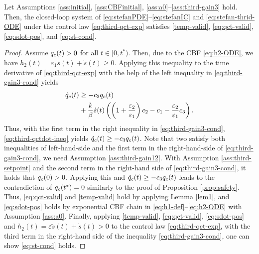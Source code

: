 \documentclass[10pt,a4paper]{amsart}
\newcommand{\ep}{\varepsilon}
\begin{document}
\begin{proposition}
    Let Assumptions \ref{ass:initial}, \ref{ass:CBFinitial}, \ref{ass:a0}--\ref{ass:third-gain3} hold. Then, the closed-loop system of \eqref{eq:stefanPDE}--\eqref{eq:stefanIC} and \eqref{eq:stefan-thrid-ODE} under the control law \eqref{eq:third-qct-exp} satisfies \eqref{temp-valid}, \eqref{eq:qct-valid}, \eqref{eq:sdot-pos}, and \eqref{eq:st-cond}. 
\end{proposition}

\begin{proof}
Assume $q_{\rm c}(t) > 0 $ for all $t \in [0, t^*)$. Then, due to the CBF \eqref{eq:h2-ODE}, we have $h_2(t) = \ep_1 \ddot s(t) + \dot s(t) \geq 0$. Applying this inequality to the time derivative of \eqref{eq:third-qct-exp}  with the help of the left inequality in \eqref{eq:third-gain3-cond} yields
\begin{align}
    \dot q_{\rm c}(t) &\geq - c_3 q_{\rm c}(t) \notag\\
    &+ \frac{k}{\beta} \dot s(t) \left( \left(1 + \frac{\ep_2}{\ep_1} \right) c_2 - c_1  - \frac{ \ep_2}{\ep_1} c_3  \right) . \label{eq:third-qctdot-ineq}
\end{align}
Thus, with the first term in the right inequality in \eqref{eq:third-gain3-cond}, 
\eqref{eq:third-qctdot-ineq} yields $\dot q_{\rm c}(t) \geq - c_3 q_{\rm c}(t)$. Note that two satisfy both inequalities of left-hand-side and the first term in the right-hand-side of \eqref{eq:third-gain3-cond}, we need Assumption \ref{ass:third-gain12}. With Assumption \ref{ass:third-setpoint} and the second term in the right-hand side of \eqref{eq:third-gain3-cond}, it holds that $q_{\rm c}(0) > 0$. Applying this and $\dot q_{\rm c}(t) \geq - c_3 q_{\rm c}(t)$ leads to the contradiction of $q_{\rm c}(t^*) = 0$ similarly to the proof of Proposition \ref{prop:safety}. Thus, \eqref{eq:qct-valid} and \eqref{temp-valid} hold by applying Lemma \ref{lem1}, and \eqref{eq:sdot-pos} holds by exponential CBF chain in \eqref{eq:h1-def}--\eqref{eq:h2-ODE} with Assumption \ref{ass:a0}. Finally, applying \eqref{temp-valid}, \eqref{eq:qct-valid}, \eqref{eq:sdot-pos} and $h_2(t) = \ep \ddot s(t) + \dot s(t) >0$ to the control law \eqref{eq:third-qct-exp}, with the third term in the right-hand side of the inequality \eqref{eq:third-gain3-cond}, one can show \eqref{eq:st-cond} holds. 


\end{proof}
\end{document}
